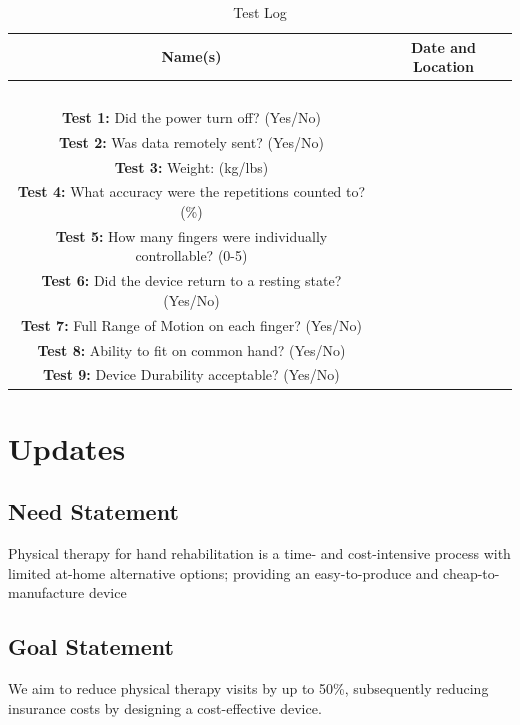 \documentclass{article}
\begin{document}
\begin{table}[H]
    \hspace*{-1cm}
    \centering
    \begin{tabular}{|c|c|}
        \hline
        \textbf{Name(s)} & \textbf{Date and Location} \\
        \hline
        \ & \ \\
        \hline
        \textbf{Test 1:} Did the power turn off? (Yes/No) & \\
        \hline
        \textbf{Test 2:} Was data remotely sent? (Yes/No) & \\
        \hline
        \textbf{Test 3:} Weight: (kg/lbs) & \\ 
        \hline
        \textbf{Test 4:} What accuracy were the repetitions counted to? (\%) & \\
        \hline
        \textbf{Test 5:} How many fingers were individually controllable? (0-5) & \\
        \hline
        \textbf{Test 6:} Did the device return to a resting state? (Yes/No) & \\
        \hline
        \textbf{Test 7:} Full Range of Motion on each finger? (Yes/No) & \\
        \hline
        \textbf{Test 8:} Ability to fit on
        common hand? (Yes/No) & \\
        \hline
        \textbf{Test 9:} Device
        Durability acceptable? (Yes/No) & \\
        \hline
    \end{tabular}
    \caption{Test Log}
    \label{tab:test_log}
\end{table}

\section{Updates}
\subsection{Need Statement}
Physical therapy for hand rehabilitation is a time- and cost-intensive process with limited at-home alternative options; providing an easy-to-produce and cheap-to-manufacture device
\subsection{Goal Statement}
We aim to reduce physical therapy visits by up to 50\%, subsequently reducing insurance costs by designing a cost-effective device.
\end{document}
